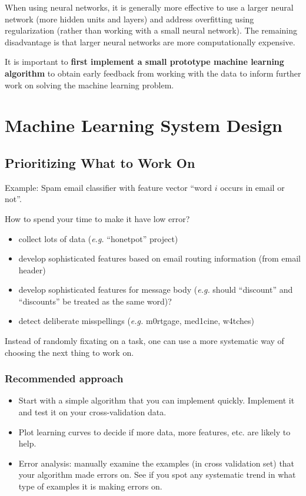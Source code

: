 \documentclass[a4paper,twoside,10pt]{article}
\begin{document}
When using neural networks, it is generally more effective to use a larger neural network (more hidden units and layers) and address overfitting using regularization (rather than working with a small neural network).
The remaining disadvantage is that larger neural networks are more computationally expensive.

It is important to \textbf{first implement a small prototype machine learning algorithm} to obtain early feedback from working with the data to inform further work on solving the machine learning problem.

\section{Machine Learning System Design}
\subsection{Prioritizing What to Work On}
Example: Spam email classifier with feature vector ``word $i$ occurs in email or not''.

How to spend your time to make it have low error?
\begin{itemize}
  \item collect lots of data (\emph{e.g.} ``honetpot'' project)
  \item develop sophisticated features based on email routing information (from email header)
  \item develop sophisticated features for message body (\emph{e.g.} should ``discount'' and ``discounts'' be treated as the same word)?
  \item detect deliberate misspellings (\emph{e.g.} m0rtgage, med1cine, w4tches)
\end{itemize}
Instead of randomly fixating on a task, one can use a more systematic way of choosing the next thing to work on.

\subsubsection{Recommended approach}
\begin{itemize}
  \item Start with a simple algorithm that you can implement quickly. Implement it and test it on your cross-validation data.
  \item Plot learning curves to decide if more data, more features, etc. are likely to help.
  \item Error analysis: manually examine the examples (in cross validation set) that your algorithm made errors on.
    See if you spot any systematic trend in what type of examples it is making errors on.
\end{itemize}
\end{document}
